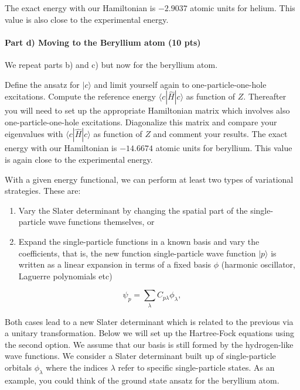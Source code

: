 \documentclass[a4wide,10pt]{article}
\begin{document}
The exact energy with our Hamiltonian is $-2.9037$ atomic units for
helium. This value is also close to the experimental energy.

\paragraph{Part d) Moving to the Beryllium atom (10 pts)}
We repeat parts b) and c) but now for the beryllium atom.

Define the ansatz for $|c\rangle$ and limit yourself again to
one-particle-one-hole excitations.  Compute the reference energy
$\langle c | \hat{H}| c \rangle $ as function of $Z$. Thereafter you
will need to set up the appropriate Hamiltonian matrix which involves
also one-particle-one-hole excitations. Diagonalize this matrix and
compare your eigenvalues with $\langle c | \hat{H}| c \rangle$ as
function of $Z$ and comment your results.  The exact energy with our
Hamiltonian is $-14.6674$ atomic units for beryllium. This value is
again close to the experimental energy. \newline\newline




With a given energy functional, we can perform at least two types of variational strategies. These are:

\begin{enumerate}
\item Vary the Slater determinant by changing the spatial part of the single-particle wave functions themselves, or

\item Expand the single-particle functions in a known basis  and vary the coefficients,  that is, the new function single-particle wave function $|p\rangle$ is written as a linear expansion in terms of a fixed basis $\phi$ (harmonic oscillator, Laguerre polynomials etc)  
\end{enumerate}

\noindent
\begin{equation*} 
\psi_p  = \sum_{\lambda} C_{p\lambda}\phi_{\lambda},
\end{equation*}

Both cases lead to a new Slater determinant which is related to the
previous via a unitary transformation.  Below we will set up the
Hartree-Fock equations using the second option.  We assume that our
basis is still formed by the hydrogen-like wave functions.  We
consider a Slater determinant built up of single-particle orbitals
$\phi_{\lambda}$ where the indices $\lambda$ refer to specific
single-particle states.  As an example, you could think of the ground
state ansatz for the beryllium atom.
\end{document}
